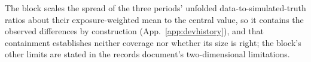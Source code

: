 The block scales the spread of the three periods' unfolded data-to-simulated-truth ratios about their exposure-weighted mean to the central value, so it contains the observed differences by construction (App.~\ref{app:devhistory}), and that containment establishes neither coverage nor whether its size is right; the block's other limits are stated in the records document's two-dimensional limitations.


